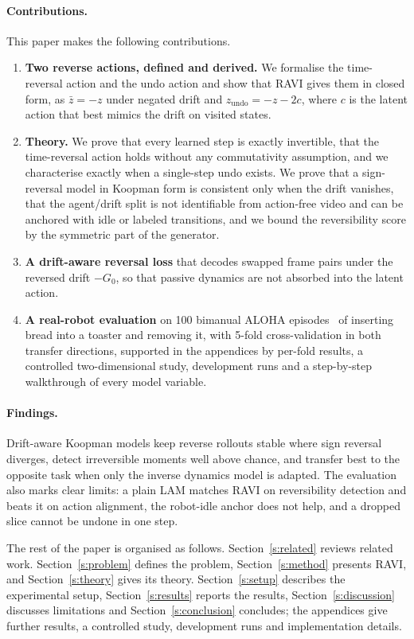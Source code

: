 \documentclass{jcse}
\newcommand{\method}{RAVI}
\newcommand{\zb}{\bar{z}}
\newcommand{\zundo}{z_{\mathrm{undo}}}
\begin{document}
\paragraph{Contributions.} This paper makes the following contributions.
\begin{enumerate}
	\item \textbf{Two reverse actions, defined and derived.} We formalise the time-reversal action and the undo action and show that {\method} gives them in closed form, as $\zb=-z$ under negated drift and $\zundo=-z-2c$, where $c$ is the latent action that best mimics the drift on visited states.
	\item \textbf{Theory.} We prove that every learned step is exactly invertible, that the time-reversal action holds without any commutativity assumption, and we characterise exactly when a single-step undo exists. We prove that a sign-reversal model in Koopman form is consistent only when the drift vanishes, that the agent/drift split is not identifiable from action-free video and can be anchored with idle or labeled transitions, and we bound the reversibility score by the symmetric part of the generator.
	\item \textbf{A drift-aware reversal loss} that decodes swapped frame pairs under the reversed drift $-G_0$, so that passive dynamics are not absorbed into the latent action.
	\item \textbf{A real-robot evaluation} on 100 bimanual ALOHA episodes~\cite{zhao2023aloha} of inserting bread into a toaster and removing it, with 5-fold cross-validation in both transfer directions, supported in the appendices by per-fold results, a controlled two-dimensional study, development runs and a step-by-step walkthrough of every model variable.
\end{enumerate}

\paragraph{Findings.}
Drift-aware Koopman models keep reverse rollouts stable where sign reversal diverges, detect irreversible moments well above chance, and transfer best to the opposite task when only the inverse dynamics model is adapted.
The evaluation also marks clear limits: a plain LAM matches {\method} on reversibility detection and beats it on action alignment, the robot-idle anchor does not help, and a dropped slice cannot be undone in one step.

The rest of the paper is organised as follows.
Section~\ref{s:related} reviews related work.
Section~\ref{s:problem} defines the problem, Section~\ref{s:method} presents {\method}, and Section~\ref{s:theory} gives its theory.
Section~\ref{s:setup} describes the experimental setup, Section~\ref{s:results} reports the results, Section~\ref{s:discussion} discusses limitations and Section~\ref{s:conclusion} concludes; the appendices give further results, a controlled study, development runs and implementation details.
\end{document}
